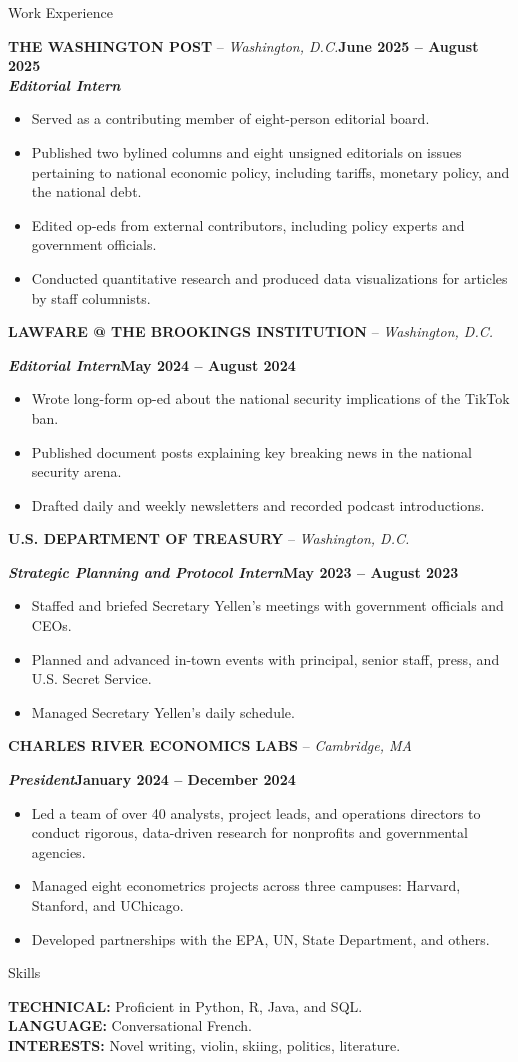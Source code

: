 \documentclass[10pt,letterpaper]{article}
\newcommand{\resumeSection}[1]{\vspace{5pt}\begin{center}{#1}\end{center}\vspace{-2pt}}
\newcommand{\resumeEntry}[4]{\textbf{#1} -- \textit{#2}\hfill\textbf{#3}\\#4\vspace{1pt}}
\newcommand{\resumeRole}[2]{\hspace*{0.18in}\textbf{\textit{#1}}\hfill\textbf{#2}}
\begin{document}
\resumeSection{Work Experience}

\resumeEntry{THE WASHINGTON POST}{Washington, D.C.}{June 2025 -- August 2025}{\hspace*{0.18in}\textbf{\textit{Editorial Intern}}}
\begin{itemize}
  \item Served as a contributing member of eight-person editorial board.
  \item Published two bylined columns and eight unsigned editorials on issues pertaining to national economic policy, including tariffs, monetary policy, and the national debt.
  \item Edited op-eds from external contributors, including policy experts and government officials.
  \item Conducted quantitative research and produced data visualizations for articles by staff columnists.
\end{itemize}

\textbf{LAWFARE @ THE BROOKINGS INSTITUTION} -- \textit{Washington, D.C.}

\resumeRole{Editorial Intern}{May 2024 -- August 2024}
\begin{itemize}
  \item Wrote long-form op-ed about the national security implications of the TikTok ban.
  \item Published document posts explaining key breaking news in the national security arena.
  \item Drafted daily and weekly newsletters and recorded podcast introductions.
\end{itemize}

\textbf{U.S. DEPARTMENT OF TREASURY} -- \textit{Washington, D.C.}

\resumeRole{Strategic Planning and Protocol Intern}{May 2023 -- August 2023}
\begin{itemize}
  \item Staffed and briefed Secretary Yellen's meetings with government officials and CEOs.
  \item Planned and advanced in-town events with principal, senior staff, press, and U.S. Secret Service.
  \item Managed Secretary Yellen's daily schedule.
\end{itemize}

\textbf{CHARLES RIVER ECONOMICS LABS} -- \textit{Cambridge, MA}

\resumeRole{President}{January 2024 -- December 2024}
\begin{itemize}
  \item Led a team of over 40 analysts, project leads, and operations directors to conduct rigorous, data-driven research for nonprofits and governmental agencies.
  \item Managed eight econometrics projects across three campuses: Harvard, Stanford, and UChicago.
  \item Developed partnerships with the EPA, UN, State Department, and others.
\end{itemize}

\resumeSection{Skills}

\textbf{TECHNICAL:} Proficient in Python, R, Java, and SQL.\\
\textbf{LANGUAGE:} Conversational French.\\
\textbf{INTERESTS:} Novel writing, violin, skiing, politics, literature.
\end{document}
